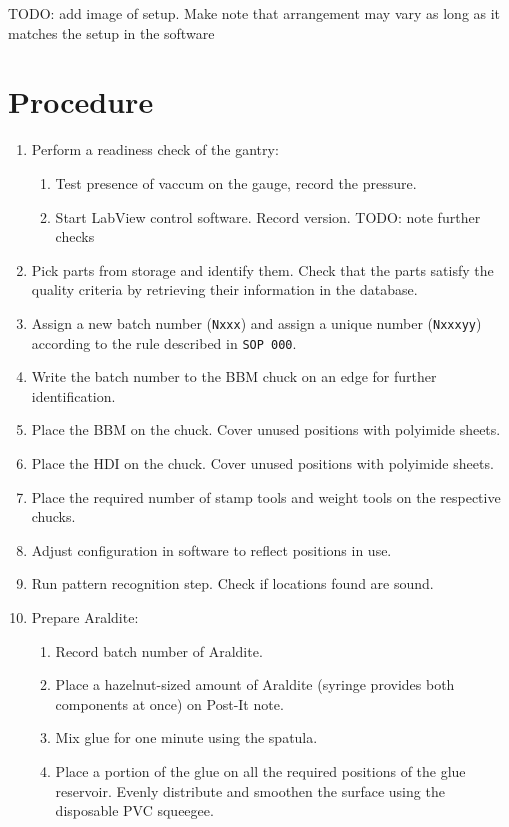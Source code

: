 \documentclass[12pt]{unlsilabsop}
\begin{document}
TODO: add image of setup. Make note that arrangement may vary as long as it matches the setup in the software

\section{Procedure}

\begin{enumerate}
    \item Perform a readiness check of the gantry:
    \begin{enumerate}
	\item Test presence of vaccum on the gauge, record the pressure.
	\item Start LabView control software. Record version. TODO: note further checks
    \end{enumerate}
    \item Pick parts from storage and identify them. Check that the parts satisfy the quality criteria by retrieving their information in the database.
    \item Assign a new batch number (\texttt{Nxxx}) and assign a unique number (\texttt{Nxxxyy}) according to the rule described in \texttt{SOP~000}.
    \item Write the batch number to the BBM chuck on an edge for further identification.
    \item Place the BBM on the chuck. Cover unused positions with polyimide sheets.
    \item Place the HDI on the chuck. Cover unused positions with polyimide sheets.
    \item Place the required number of stamp tools and weight tools on the respective chucks.
    \item Adjust configuration in software to reflect positions in use.
    \item Run pattern recognition step. Check if locations found are sound.
    \item Prepare Araldite:
    \begin{enumerate}
	\item Record batch number of Araldite.
	\item Place a hazelnut-sized amount of Araldite (syringe provides both components at once) on Post-It note.
	\item Mix glue for one minute using the spatula.
	\item Place a portion of the glue on all the required positions of the glue reservoir. Evenly distribute and smoothen the surface using the disposable PVC squeegee.

\end{enumerate}
\end{enumerate}
\end{document}
